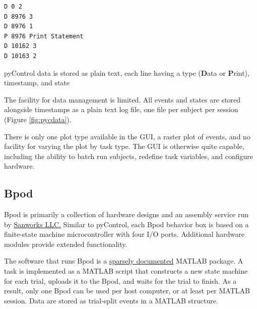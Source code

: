 \documentclass[nohyper, justified, notitlepage, marginals=raggedright,twoside=false,debug]{tufte-autopilot}
\begin{document}
\begin{marginfigure}[-0.4cm]
\begin{verbatim}
D 0 2
D 8976 3
D 8976 1
P 8976 Print Statement
D 10162 3
D 10163 2
\end{verbatim}
\caption{pyControl data is stored as plain text, each line having a type (\textbf{D}ata or \textbf{P}rint), timestamp, and state}
\label{fig:pycdata}
\end{marginfigure}

The facility for data management is limited. All events and states are stored alongside timestamps as a plain text log file, one file per subject per session (Figure \ref{fig:pycdata}).

There is only one plot type available in the GUI, a raster plot of events, and no facility for varying the plot by task type. The GUI is otherwise quite capable, including the ability to batch run subjects, redefine task variables, and configure hardware.\\

\subsection{Bpod}

Bpod is primarily a collection of hardware designs and an assembly service run by \href{https://www.sanworks.io/about/about.php}{Sanworks LLC.} Similar to pyControl, each Bpod behavior box is based on a finite-state machine microcontroller with four I/O ports. Additional hardware modules provide extended functionality.

The software that runs Bpod is a \href{https://sites.google.com/site/bpoddocumentation/bpod-user-guide/function-reference-beta}{sparsely documented} MATLAB package. A task is implemented as a MATLAB script that constructs a new state machine for each trial, uploads it to the Bpod, and waits for the trial to finish. As a result, only one Bpod can be used per host computer, or at least per MATLAB session. Data are stored as trial-split events in a MATLAB structure.
\end{document}
